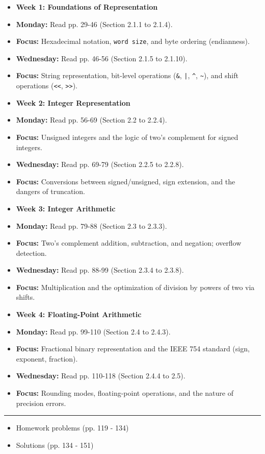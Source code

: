\documentclass[11pt,a4paper]{report}
\begin{document}
\begin{itemize}
  \item \textbf{Week 1: Foundations of Representation}
  \item \textbf{Monday:} Read pp. 29-46 (Section 2.1.1 to 2.1.4).
  \item \textbf{Focus:} Hexadecimal notation, \texttt{word size}, and byte ordering (endianness).
  \item \textbf{Wednesday:} Read pp. 46-56 (Section 2.1.5 to 2.1.10).
  \item \textbf{Focus:} String representation, bit-level operations (\texttt{\&}, \texttt{|}, \texttt{\textasciicircum{}}, \texttt{\textasciitilde{}}), and shift operations (\texttt{\textless{}\textless{}}, \texttt{\textgreater{}\textgreater{}}).

  \item \textbf{Week 2: Integer Representation}
  \item \textbf{Monday:} Read pp. 56-69 (Section 2.2 to 2.2.4).
  \item \textbf{Focus:} Unsigned integers and the logic of two's complement for signed integers.
  \item \textbf{Wednesday:} Read pp. 69-79 (Section 2.2.5 to 2.2.8).
  \item \textbf{Focus:} Conversions between signed/unsigned, sign extension, and the dangers of truncation.

  \item \textbf{Week 3: Integer Arithmetic}
  \item \textbf{Monday:} Read pp. 79-88 (Section 2.3 to 2.3.3).
  \item \textbf{Focus:} Two's complement addition, subtraction, and negation; overflow detection.
  \item \textbf{Wednesday:} Read pp. 88-99 (Section 2.3.4 to 2.3.8).
  \item \textbf{Focus:} Multiplication and the optimization of division by powers of two via shifts.

  \item \textbf{Week 4: Floating-Point Arithmetic}
  \item \textbf{Monday:} Read pp. 99-110 (Section 2.4 to 2.4.3).
  \item \textbf{Focus:} Fractional binary representation and the IEEE 754 standard (sign, exponent, fraction).
  \item \textbf{Wednesday:} Read pp. 110-118 (Section 2.4.4 to 2.5).
  \item \textbf{Focus:} Rounding modes, floating-point operations, and the nature of precision errors.

\end{itemize}
\noindent\rule{\textwidth}{0.4pt}
\begin{itemize}
  \item Homework problems (pp. 119 - 134)
  \item Solutions (pp. 134 - 151)

\end{itemize}
\end{document}
